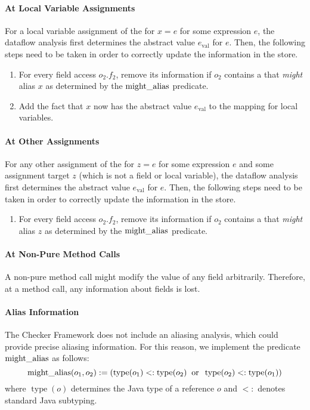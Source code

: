 \begin{new}
\paragraph{At Local Variable Assignments}

For a local variable assignment of the for $x = e$ for some expression $e$,
the dataflow analysis first determines the abstract value $e_\text{val}$ for
$e$. Then, the following steps need to be taken in order to correctly update
the information in the store.
\begin{enumerate}
    \item For every field access $o_2.f_2$, remove its information if
    $o_2$ contains a  that \emph{might}
    alias $x$ as determined by the $\operatorname{might\_alias}$
    predicate.
    \item Add the fact that $x$ now has the abstract value $e_\text{val}$
    to the mapping for local variables.
\end{enumerate}

\paragraph{At Other Assignments}

For any other assignment of the for $z = e$ for some expression $e$ and some
assignment target $z$ (which is not a field or local variable),
the dataflow analysis first determines the abstract value $e_\text{val}$ for
$e$. Then, the following steps need to be taken in order to correctly update
the information in the store.
\begin{enumerate}
    \item For every field access $o_2.f_2$, remove its information if
    $o_2$ contains a  that \emph{might}
    alias $z$ as determined by the $\operatorname{might\_alias}$ predicate.
\end{enumerate}


\paragraph{At Non-Pure Method Calls}

A non-pure method call might modify the value of any field arbitrarily.
Therefore, at a method call, any information about fields is lost.


\paragraph{Alias Information}
The Checker Framework does not include an aliasing analysis, which could
provide precise aliasing information.  For this reason, we implement the
predicate $\operatorname{might\_alias}$ as follows:
\[ \operatorname{might\_alias}(o_1,o_2) :=
\left(\operatorname{type}(o_1) <: \operatorname{type}(o_2)
\;\;\text{or}\;\;
\operatorname{type}(o_2) <: \operatorname{type}(o_1) \right) \]
where $\operatorname{type}(o)$ determines the Java type of a reference $o$
and $<:$ denotes standard Java subtyping.

\end{new}


